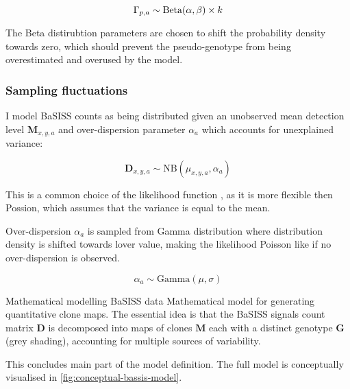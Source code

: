 \begin{equation} 
    {\Gamma}_{p,a} \sim \text{Beta}(\alpha, \beta) \times k \\
\end{equation}

The Beta distirubtion parameters are chosen to shift the probability density towards zero, which should prevent the pseudo-genotype from being overestimated and overused by the model.

\subsubsection*{Sampling fluctuations}

I model BaSISS counts as being  distributed given an unobserved mean detection level $\mathbf{M}_{x,y,a}$ and over-dispersion parameter ${\alpha}_a$ which accounts for unexplained variance:

\begin{equation} 
\mathbf{D}_{x,y,a} \sim \text{NB}(\mu_{x,y,a}, \alpha_a)
\end{equation}

This is a common choice of the likelihood function \parencite{Kleshchevnikov2022-ub, Townes2023-uj}, as it is more flexible then Possion, which assumes that the variance is equal to the mean.

Over-dispersion $\alpha_a$ is sampled from Gamma distribution where distribution density is shifted towards lover value, making the likelihood Poisson like if no over-dispersion is observed.

\begin{equation}
    {\alpha}_a \sim \mathrm{Gamma}(\mu, \sigma)
\end{equation} 

    {Mathematical modelling \ac{BaSISS} data}
    {Mathematical model for generating quantitative clone maps. The essential idea is that the \ac{BaSISS} signals count matrix $\mathbf{D}$ is decomposed into maps of clones $\mathbf{M}$ each with
    a distinct genotype $\mathbf{G}$ (grey shading), accounting for multiple sources of variability.}


This concludes main part of the model definition. The full model is conceptually visualised in \cref{fig:conceptual-bassis-model}.

